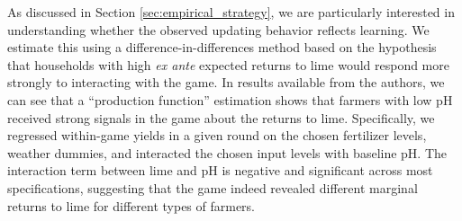 \documentclass[12pt,letterpaper]{article}
\begin{document}


% 



 


As discussed in Section \ref{sec:empirical_strategy}, we are particularly interested in understanding whether the observed updating behavior reflects learning. We estimate this using a difference-in-differences method based on the hypothesis that households with high \textit{ex ante} expected returns to lime would respond more strongly to interacting with the game. In results available from the authors, we can see that a ``production function'' estimation shows that farmers with low pH received strong signals in the game about the returns to lime. Specifically, we regressed within-game yields in a given round on the chosen fertilizer levels, weather dummies, and interacted the chosen input levels with baseline pH. The interaction term between lime and pH is negative and significant across most specifications, suggesting that the game indeed revealed different marginal returns to lime for different types of farmers. 
\end{document}
